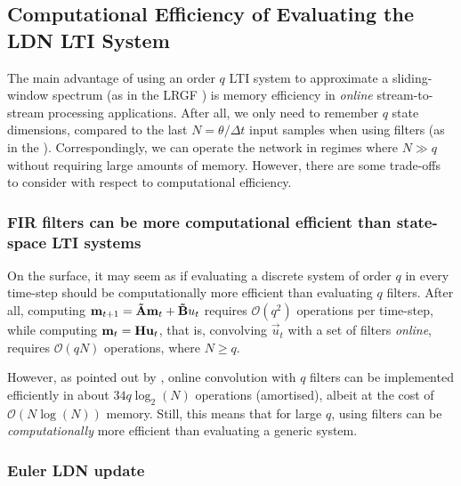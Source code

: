 \subsection{Computational Efficiency of Evaluating the LDN LTI System}
\label{sec:ldn_computational_efficiency}

The main advantage of using an order $q$ LTI system to approximate a sliding-window spectrum (as in the LRGF \LMU) is memory efficiency in \emph{online} stream-to-stream processing applications.
After all, we only need to remember $q$ state dimensions, compared to the last $N = \theta / \Delta t$ input samples when using \FIR filters (as in the \FIR \LMU).
Correspondingly, we can operate the network in regimes where $N \gg q$ without requiring large amounts of memory.
However, there are some trade-offs to consider with respect to computational efficiency.

\subsubsection{FIR filters can be more computational efficient than state-space LTI systems}
On the surface, it may seem as if evaluating a discrete \LTI system of order $q$ in every time-step should be computationally more efficient than evaluating $q$ \FIR filters.
After all, computing $\mathbf{m}_{t + 1} = \mathbf{\tilde A} \mathbf{m}_t + \mathbf{\tilde B} u_t$ requires $\mathcal{O}(q^2)$ operations per time-step, while computing $\mathbf{m}_t = \mathbf{H} \mathbf{u}_t$, that is, convolving $\vec u_t$ with a set of \FIR filters \emph{online}, requires $\mathcal{O}(qN)$ operations, where $N \geq q$.

However, as pointed out by \citet{gardner1995efficient}, online convolution with $q$ \FIR filters can be implemented efficiently in about $34 q \log_2(N)$ operations (amortised), albeit at the cost of $\mathcal{O}(N \log(N))$ memory.
Still, this means that for large $q$, using \FIR filters can be \emph{computationally} more efficient than evaluating a generic \LTI system.

\subsubsection{Euler LDN update}


